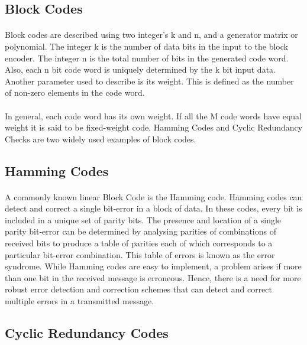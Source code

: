 \documentclass[14pt]{report}
\begin{document}
{\subsection{Block Codes}
\paragraph{} Block codes are described using two integer’s k and n, and a generator matrix or polynomial. The integer k is the number of data bits in the input to the block encoder. The integer n is the total number of bits in the generated code word. Also, each n bit code word is uniquely determined by the k bit input data.
Another parameter used to describe is its weight. This is defined as the number of non-zero elements in the code word.
\paragraph{} In general, each code word has its own weight. If all the M code words have equal weight it is said to be fixed-weight code.
Hamming Codes and Cyclic Redundancy Checks are two widely used examples of block codes.
\subsection{Hamming Codes}
\paragraph{} A commonly known linear Block Code is the Hamming code. Hamming codes can detect and correct a single bit-error in a block of data. In these codes, every bit is included in a unique set of parity bits. The presence and location of a single parity bit-error can be determined by analysing parities of combinations of received bits to produce a table of parities each of which corresponds to a particular bit-error combination. This table of errors is known as the error syndrome.   While Hamming codes are easy to implement, a problem arises if more than one bit in the received message is erroneous. Hence, there is a need for more robust error detection and correction schemes that can detect and correct multiple errors in a transmitted message. 
\subsection{Cyclic Redundancy Codes}
}
\end{document}
